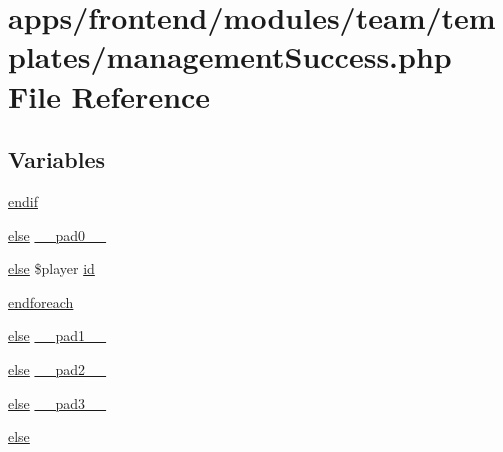 \hypertarget{frontend_2modules_2team_2templates_2management_success_8php}{\section{apps/frontend/modules/team/templates/management\-Success.php File Reference}
\label{frontend_2modules_2team_2templates_2management_success_8php}
}
\subsection*{Variables}
\begin{DoxyCompactItemize}
\item 
\hyperlink{frontend_2modules_2team_2templates_2management_success_8php_a82cd33ca97ff99f2fcc5e9c81d65251b}{endif}
\item 
\hyperlink{live_2modules_2team_2templates_2management_success_8php_a0544c3fe466e421738dae463968b70ba}{else} \hyperlink{frontend_2modules_2team_2templates_2management_success_8php_a8e01dcc96c43199448ee66f7c2ae8ea6}{\-\_\-\-\_\-pad0\-\_\-\-\_\-}
\item 
\hyperlink{live_2modules_2team_2templates_2management_success_8php_a0544c3fe466e421738dae463968b70ba}{else} \$player \hyperlink{frontend_2modules_2team_2templates_2management_success_8php_a43be86cd29c39838cf73d6a9d079212d}{id}
\item 
\hyperlink{frontend_2modules_2team_2templates_2management_success_8php_a672d9707ef91db026c210f98cc601123}{endforeach}
\item 
\hyperlink{live_2modules_2team_2templates_2management_success_8php_a0544c3fe466e421738dae463968b70ba}{else} \hyperlink{frontend_2modules_2team_2templates_2management_success_8php_ae8b4bb1441c6ab4dcb28a37bc46c8ead}{\-\_\-\-\_\-pad1\-\_\-\-\_\-}
\item 
\hyperlink{live_2modules_2team_2templates_2management_success_8php_a0544c3fe466e421738dae463968b70ba}{else} \hyperlink{frontend_2modules_2team_2templates_2management_success_8php_aed2d37b4e8da3f52103ae96ce9d26d82}{\-\_\-\-\_\-pad2\-\_\-\-\_\-}
\item 
\hyperlink{live_2modules_2team_2templates_2management_success_8php_a0544c3fe466e421738dae463968b70ba}{else} \hyperlink{frontend_2modules_2team_2templates_2management_success_8php_ad3aa1069376b85bd4e503b216d54b18d}{\-\_\-\-\_\-pad3\-\_\-\-\_\-}
\item 
\hyperlink{frontend_2modules_2team_2templates_2management_success_8php_a0544c3fe466e421738dae463968b70ba}{else}

\end{DoxyCompactItemize}
